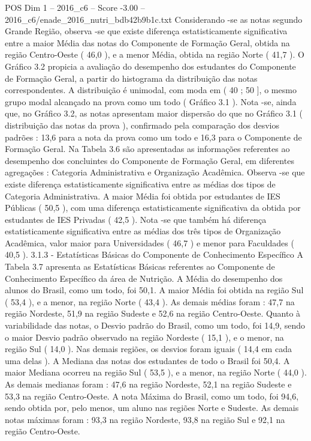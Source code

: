 \begin{textsample}{POS Dim 1 – 2016\_c6 – Score -3.00 – 2016\_c6/enade\_2016\_nutri\_bdb42b9b1c.txt}
Considerando -se as notas segundo Grande Região, observa -se que existe diferença estatisticamente significativa entre a maior Média das notas do Componente de Formação Geral, obtida na região Centro-Oeste ( 46,0 ), e a menor Média, obtida na região Norte ( 41,7 ).
O Gráfico 3.2 propicia a avaliação do desempenho dos estudantes do Componente de Formação Geral, a partir do histograma da distribuição das notas correspondentes.
A distribuição é unimodal, com moda em ( 40 ; 50 ], o mesmo grupo modal alcançado na prova como um todo ( Gráfico 3.1 ).
Nota -se, ainda que, no Gráfico 3.2, as notas apresentam maior dispersão do que no Gráfico 3.1 ( distribuição das notas da prova ), confirmado pela comparação dos desvios padrões : 13,6 para a nota da prova como um todo e 16,3 para o Componente de Formação Geral.
Na Tabela 3.6 são apresentadas as informações referentes ao desempenho dos concluintes do Componente de Formação Geral, em diferentes agregações : Categoria Administrativa e Organização Acadêmica.
Observa -se que existe diferença estatisticamente significativa entre as médias dos tipos de Categoria Administrativa.
A maior Média foi obtida por estudantes de IES Públicas ( 50,5 ), com uma diferença estatisticamente significativa da obtida por estudantes de IES Privadas ( 42,5 ).
Nota -se que também há diferença estatisticamente significativa entre as médias dos três tipos de Organização Acadêmica, valor maior para Universidades ( 46,7 ) e menor para Faculdades ( 40,5 ). 3.1.3 - Estatísticas Básicas do Componente de Conhecimento Específico A Tabela 3.7 apresenta as Estatísticas Básicas referentes ao Componente de Conhecimento Específico da área de Nutrição.
A Média do desempenho dos alunos do Brasil, como um todo, foi 50,1.
A maior Média foi obtida na região Sul ( 53,4 ), e a menor, na região Norte ( 43,4 ).
As demais médias foram : 47,7 na região Nordeste, 51,9 na região Sudeste e 52,6 na região Centro-Oeste.
Quanto à variabilidade das notas, o Desvio padrão do Brasil, como um todo, foi 14,9, sendo o maior Desvio padrão observado na região Nordeste ( 15,1 ), e o menor, na região Sul ( 14,0 ).
Nas demais regiões, os desvios foram iguais ( 14,4 em cada uma delas ).
A Mediana das notas dos estudantes de todo o Brasil foi 50,4.
A maior Mediana ocorreu na região Sul ( 53,5 ), e a menor, na região Norte ( 44,0 ).
As demais medianas foram : 47,6 na região Nordeste, 52,1 na região Sudeste e 53,3 na região Centro-Oeste.
A nota Máxima do Brasil, como um todo, foi 94,6, sendo obtida por, pelo menos, um aluno nas regiões Norte e Sudeste.
As demais notas máximas foram : 93,3 na região Nordeste, 93,8 na região Sul e 92,1 na região Centro-Oeste.

\end{textsample}
